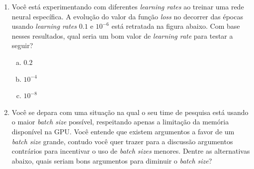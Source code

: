 \documentclass{dlproblemset}
\begin{document}
\begin{enumerate}[1)]
	\begin{enumerate}[(a)]
	    \item Aparentemente isso é um problema dos dados, obter uma quantidade maior de dados para efetuar o treinamento é uma alternativa razoável.
	    \item Aumentar o valor hiperparâmetro \textit{learning rate} pode ajudar pois o processo de otimização vai chegar a um mínimo mais rápido.
	    \item Diminuir o valor do hiperparâmetro \textit{learning rate} pode ajudar pois passos menores evitam que o processo de otimização ``pule'' o mínimo em vez de assentar nele.
	    \item Aumentar o hiperparâmetro \textit{batch size} pode ajudar pois cada estimativa do gradiente passa a usar mais exemplos. Assim a variância da estimativa diminui e os passos da otimização ficam mais estáveis.
	\end{enumerate}

    \item Você está experimentando com diferentes \textit{learning rates} ao treinar uma rede neural específica. A evolução do valor da função \textit{loss} no decorrer das épocas usando \textit{learning rates} $0.1$ e $10^{-6}$ está retratada na figura abaixo. Com base nesses resultados, qual seria um bom valor de \textit{learning rate} para testar a seguir?

    \begin{figure}[H]
        \centering
        \resizebox{0.55\linewidth}{!}{}
    \end{figure}

    \begin{enumerate}[(a)]
	    \item $0.2$
	    \item $10^{-4}$
	    \item $10^{-8}$
    \end{enumerate}

    \item Você se depara com uma situação na qual o seu time de pesquisa está usando o maior \textit{batch size} possível, respeitando apenas a limitação da memória disponível na GPU. Você entende que existem argumentos a favor de um \textit{batch size} grande, contudo você quer trazer para a discussão argumentos contrários para incentivar o uso de \textit{batch sizes} menores. Dentre as alternativas abaixo, quais seriam bons argumentos para diminuir o \textit{batch size}?


\end{enumerate}
\end{document}
